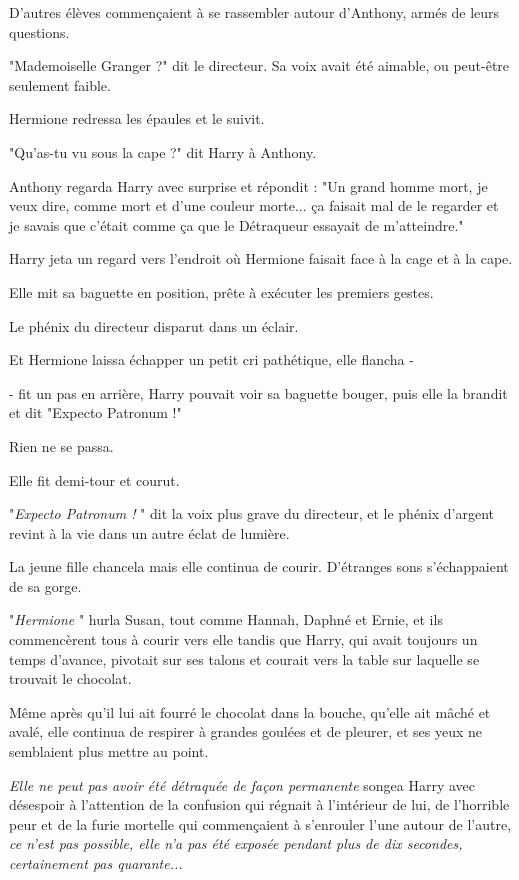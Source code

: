 D'autres élèves commençaient à se rassembler autour d'Anthony, armés de leurs questions.

"Mademoiselle Granger ?" dit le directeur. Sa voix avait été aimable, ou peut-être seulement faible.

Hermione redressa les épaules et le suivit.

"Qu'as-tu vu sous la cape ?" dit Harry à Anthony.

Anthony regarda Harry avec surprise et répondit : "Un grand homme mort, je veux dire, comme mort et d'une couleur morte... ça faisait mal de le regarder et je savais que c'était comme ça que le Détraqueur essayait de m'atteindre."

Harry jeta un regard vers l'endroit où Hermione faisait face à la cage et à la cape.

Elle mit sa baguette en position, prête à exécuter les premiers gestes.

Le phénix du directeur disparut dans un éclair.

Et Hermione laissa échapper un petit cri pathétique, elle flancha -

- fit un pas en arrière, Harry pouvait voir sa baguette bouger, puis elle la brandit et dit "Expecto Patronum !"

Rien ne se passa.

Elle fit demi-tour et courut.

"\emph{Expecto Patronum !} " dit la voix plus grave du directeur, et le phénix d'argent revint à la vie dans un autre éclat de lumière.

La jeune fille chancela mais elle continua de courir. D'étranges sons s'échappaient de sa gorge.

"\emph{Hermione} " hurla Susan, tout comme Hannah, Daphné et Ernie, et ils commencèrent tous à courir vers elle tandis que Harry, qui avait toujours un temps d'avance, pivotait sur ses talons et courait vers la table sur laquelle se trouvait le chocolat.

Même après qu'il lui ait fourré le chocolat dans la bouche, qu'elle ait mâché et avalé, elle continua de respirer à grandes goulées et de pleurer, et ses yeux ne semblaient plus mettre au point.

\emph{Elle ne peut pas avoir été détraquée de façon permanente}  songea Harry avec désespoir à l'attention de la confusion qui régnait à l'intérieur de lui, de l'horrible peur et de la furie mortelle qui commençaient à s'enrouler l'une autour de l'autre, \emph{ce n'est pas possible, elle n'a pas été exposée pendant plus de dix secondes, certainement pas quarante...} 

